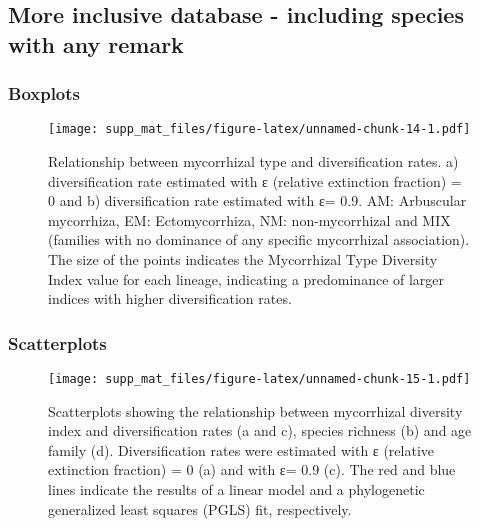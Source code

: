 \documentclass[]{article}
\begin{document}
\hypertarget{more-inclusive-database---including-species-with-any-remark}{%
\subsection{More inclusive database - including species with any
remark}\label{more-inclusive-database---including-species-with-any-remark}}

\hypertarget{boxplots-2}{%
\subsubsection{Boxplots}\label{boxplots-2}}

\begin{figure}
\centering
\texttt{[image: supp\_mat\_files/figure-latex/unnamed-chunk-14-1.pdf]}
\caption{Relationship between mycorrhizal type and diversification
rates. a) diversification rate estimated with ε (relative extinction
fraction) = 0 and b) diversification rate estimated with ε= 0.9. AM:
Arbuscular mycorrhiza, EM: Ectomycorrhiza, NM: non-mycorrhizal and MIX
(families with no dominance of any specific mycorrhizal association).
The size of the points indicates the Mycorrhizal Type Diversity Index
value for each lineage, indicating a predominance of larger indices with
higher diversification rates.}
\end{figure}

\hypertarget{scatterplots-2}{%
\subsubsection{Scatterplots}\label{scatterplots-2}}

\begin{figure}
\centering
\texttt{[image: supp\_mat\_files/figure-latex/unnamed-chunk-15-1.pdf]}
\caption{Scatterplots showing the relationship between mycorrhizal
diversity index and diversification rates (a and c), species richness
(b) and age family (d). Diversification rates were estimated with ε
(relative extinction fraction) = 0 (a) and with ε= 0.9 (c). The red and
blue lines indicate the results of a linear model and a phylogenetic
generalized least squares (PGLS) fit, respectively.}
\end{figure}
\end{document}
